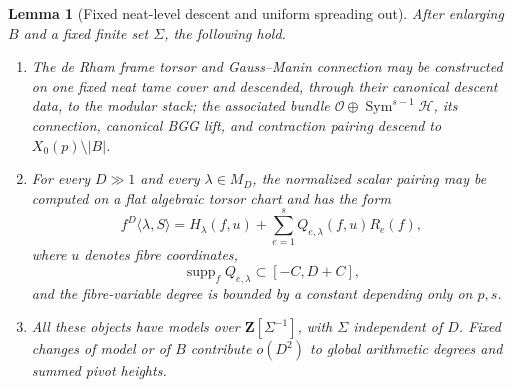 \documentclass[11pt]{article}
\newtheorem{lemma}[lemma]{Lemma}
\theoremstyle{definition}
\theoremstyle{remark}
\newcommand{\Z}{\mathbf Z}
\newcommand{\Sym}{\operatorname{Sym}}
\newcommand{\calH}{\mathcal H}
\newcommand{\calO}{\mathcal O}
\newcommand{\abs}[1]{\left|#1\right|}
\begin{document}
\begin{lemma}[Fixed neat-level descent and uniform spreading out]
\label{lem:neat-descent}
After enlarging $B$ and a fixed finite set $\Sigma$, the following hold.

\begin{enumerate}[label=\textup{(\roman*)}]
\item The de Rham frame torsor and Gauss--Manin connection may be constructed
on one fixed neat tame cover and descended, through their canonical descent
data, to the modular stack; the associated bundle
$\calO\oplus\Sym^{s-1}\calH$, its connection, canonical BGG lift, and
contraction pairing descend to $X_0(p)\setminus\abs B$.

\item For every $D\gg1$ and every $\lambda\in M_D$, the normalized scalar
pairing may be computed on a flat algebraic torsor chart and has the form
\begin{equation}\label{eq:torsor-decomp-bridge}
 f^D\langle\lambda,S\rangle
 =H_\lambda(f,u)+\sum_{e=1}^sQ_{e,\lambda}(f,u)R_e(f),
\end{equation}
where $u$ denotes fibre coordinates,
\[
 \operatorname{supp}_fQ_{e,\lambda}\subset[-C,D+C],
\]
and the fibre-variable degree is bounded by a constant depending only on
$p,s$.

\item All these objects have models over $\Z[\Sigma^{-1}]$, with $\Sigma$
independent of $D$.  Fixed changes of model or of $B$ contribute
$o(D^2)$ to global arithmetic degrees and summed pivot heights.
\end{enumerate}
\end{lemma}
\end{document}
